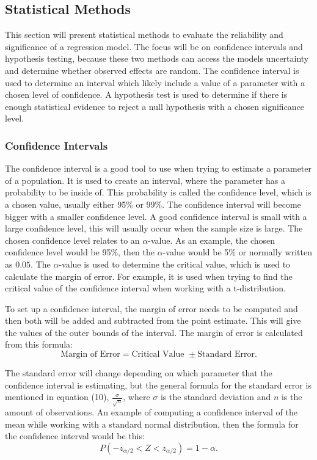 \subsection{Statistical Methods}
This section will present statistical methods to evaluate the reliability and significance of a regression model. The focus will be on confidence intervals and hypothesis testing, because these two methods can access the models uncertainty and determine whether observed effects are random. The confidence interval is used to determine an interval which likely include a value of a parameter with a chosen level of confidence. A hypothesis test is used to determine if there is enough statistical evidence to reject a null hypothesis with a chosen significance level.

\subsubsection{Confidence Intervals}
The confidence interval is a good tool to use when trying to estimate a parameter of a population. It is used to create an interval, where the parameter has a probability to be inside of. This probability is called the confidence level, which is a chosen value, usually either 95\% or 99\%. The confidence interval will become bigger with a smaller confidence level. A good confidence interval is small with a large confidence level, this will usually occur when the sample size is large. The chosen confidence level relates to an $\alpha$-value. As an example, the chosen confidence level would be 95\%, then the $\alpha$-value would be 5\% or normally written as $0.05$. The $\alpha$-value is used to determine the critical value, which is used to calculate the margin of error. For example, it is used when trying to find the critical value of the confidence interval when working with a t-distribution.
\newline

\noindent To set up a confidence interval, the margin of error needs to be computed and then both will be added and subtracted from the point estimate. This will give the values of the outer bounds of the interval. The margin of error is calculated from this formula:
\begin{equation}
	\text{Margin of Error} = \text{Critical Value } \pm \text{Standard Error}.
\end{equation}

\noindent The standard error will change depending on which parameter that the confidence interval is estimating, but the general formula for the standard error is mentioned in equation (10), $\frac{\sigma}{\sqrt{n}}$, where $\sigma$ is the standard deviation and $n$ is the amount of observations. An example of computing a confidence interval of the mean while working with a standard normal distribution, then the formula for the confidence interval would be this:
\begin{equation}
P(-z_{\alpha/2}<Z<z_{\alpha/2}) = 1-\alpha.
\end{equation}

